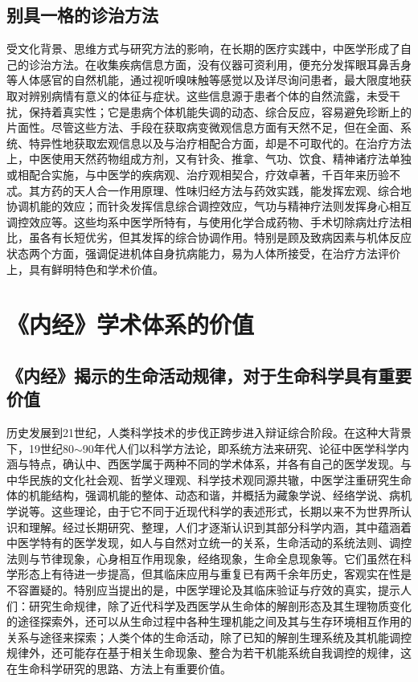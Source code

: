\documentclass[draft,12pt]{ctexbook}
\begin{document}
\subsection{别具一格的诊治方法} %

受文化背景、思维方式与研究方法的影响，在长期的医疗实践中，中医学形成了自己的诊治方法。在收集疾病信息方面，没有仪器可资利用，便充分发挥眼耳鼻舌身等人体感官的自然机能，通过视听嗅味触等感觉以及详尽询问患者，最大限度地获取对辨别病情有意义的体征与症状。这些信息源于患者个体的自然流露，未受干扰，保持着真实性；它是患病个体机能失调的动态、综合反应，容易避免珍断上的片面性。尽管这些方法、手段在获取病变微观信息方面有天然不足，但在全面、系统、特异性地获取宏观信息以及与治疗相配合方面，却是不可取代的。在治疗方法上，中医使用天然药物组成方剂，又有针灸、推拿、气功、饮食、精神诸疗法单独或相配合实施，与中医学的疾病观、治疗观相契合，疗效卓著，千百年来历验不忒。其方药的天人合一作用原理、性味归经方法与药效实践，能发挥宏观、综合地协调机能的效应；而针灸发挥信息综合调控效应，气功与精神疗法则发挥身心相互调控效应等。这些均系中医学所特有，与使用化学合成药物、手术切除病灶疗法相比，虽各有长短优劣，但其发挥的综合协调作用。特别是顾及致病因素与机体反应状态两个方面，强调促进机体自身抗病能力，易为人体所接受，在治疗方法评价上，具有鲜明特色和学术价值。

\section{《内经》学术体系的价值} %

\subsection{《内经》揭示的生命活动规律，对于生命科学具有重要价值} %

历史发展到21世纪，人类科学技术的步伐正跨步进入辩证综合阶段。在这种大背景下，19世纪80$\sim$90年代人们以科学方法论，即系统方法来研究、论征中医学科学内涵与特点，确认中、西医学属于两种不同的学术体系，并各有自己的医学发现。与中华民族的文化社会观、哲学义理观、科学技术观同源共辙，中医学注重研究生命体的机能结构，强调机能的整体、动态和谐，并概括为藏象学说、经络学说、病机学说等。这些理论，由于它不同于近现代科学的表述形式，长期以来不为世界所认识和理解。经过长期研究、整理，人们才逐渐认识到其部分科学内涵，其中蕴涵着中医学特有的医学发现，如人与自然对立统一的关系，生命活动的系统法则、调控法则与节律现象，心身相互作用现象，经络现象，生命全息现象等。它们虽然在科学形态上有待进一步提高，但其临床应用与重复已有两千余年历史，客观实在性是不容置疑的。特别应当提出的是，中医学理论及其临床验证与疗效的真实，提示人们：研究生命规律，除了近代科学及西医学从生命体的解剖形态及其生理物质变化的途径探索外，还可以从生命过程中各种生理机能之间及其与生存环境相互作用的关系与途径来探索；人类个体的生命活动，除了已知的解剖生理系统及其机能调控规律外，还可能存在基于相关生命现象、整合为若干机能系统自我调控的规律，这在生命科学研究的思路、方法上有重要价值。
\end{document}
